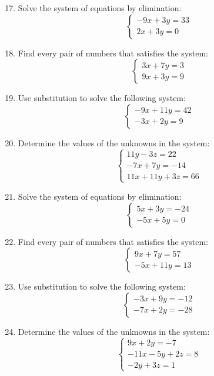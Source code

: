 \documentclass[11pt]{article}
\begin{document}
\begin{enumerate}
\setcounter{enumi}{16}
\setlength{\itemsep}{8pt}
\item Solve the system of equations by elimination:
\label{eq038}\[
  \left\{ \begin{array}{l} -9x + 3y = 33 \\ 2x + 3y = 0 \end{array} \right.
\]
\item Find every pair of numbers that satisfies the system:
\label{eq039}\[
  \left\{ \begin{array}{l} 3x + 7y = 3 \\ 9x + 3y = 9 \end{array} \right.
\]
\item Use substitution to solve the following system:
\label{eq040}\[
  \left\{ \begin{array}{l} -9x + 11y = 42 \\ -3x + 2y = 9 \end{array} \right.
\]
\item Determine the values of the unknowns in the system:
\label{eq041}\[
  \left\{ \begin{array}{l} 11y - 3z = 22 \\ -7x + 7y = -14 \\ 11x + 11y + 3z = 66 \end{array} \right.
\]
\item Solve the system of equations by elimination:
\label{eq042}\[
  \left\{ \begin{array}{l} 5x + 3y = -24 \\ -5x + 5y = 0 \end{array} \right.
\]
\item Find every pair of numbers that satisfies the system:
\label{eq043}\[
  \left\{ \begin{array}{l} 9x + 7y = 57 \\ -5x + 11y = 13 \end{array} \right.
\]
\item Use substitution to solve the following system:
\label{eq044}\[
  \left\{ \begin{array}{l} -3x + 9y = -12 \\ -7x + 2y = -28 \end{array} \right.
\]
\item Determine the values of the unknowns in the system:
\label{eq045}\[
  \left\{ \begin{array}{l} 9x + 2y = -7 \\ -11x - 5y + 2z = 8 \\ -2y + 3z = 1 \end{array} \right.
\]
\end{enumerate}
\end{document}
